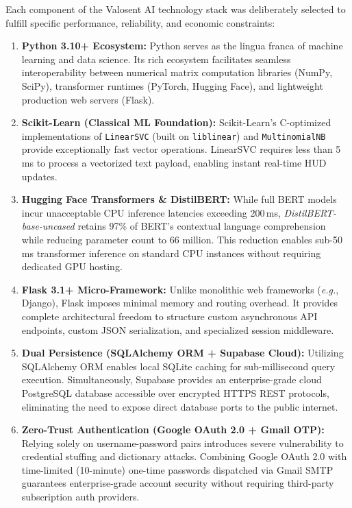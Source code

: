 Each component of the Valosent AI technology stack was deliberately selected to fulfill specific performance, reliability, and economic constraints:
\begin{enumerate}
    \item \textbf{Python 3.10+ Ecosystem:} Python serves as the lingua franca of machine learning and data science. Its rich ecosystem facilitates seamless interoperability between numerical matrix computation libraries (NumPy, SciPy), transformer runtimes (PyTorch, Hugging Face), and lightweight production web servers (Flask).
    \item \textbf{Scikit-Learn (Classical ML Foundation):} Scikit-Learn's C-optimized implementations of \texttt{LinearSVC} (built on \texttt{liblinear}) and \texttt{MultinomialNB} provide exceptionally fast vector operations. LinearSVC requires less than 5\,ms to process a vectorized text payload, enabling instant real-time HUD updates.
    \item \textbf{Hugging Face Transformers \& DistilBERT:} While full BERT models incur unacceptable CPU inference latencies exceeding 200\,ms, \textit{DistilBERT-base-uncased} retains 97\% of BERT's contextual language comprehension while reducing parameter count to 66 million. This reduction enables sub-50\,ms transformer inference on standard CPU instances without requiring dedicated GPU hosting.
    \item \textbf{Flask 3.1+ Micro-Framework:} Unlike monolithic web frameworks (\textit{e.g.}, Django), Flask imposes minimal memory and routing overhead. It provides complete architectural freedom to structure custom asynchronous API endpoints, custom JSON serialization, and specialized session middleware.
    \item \textbf{Dual Persistence (SQLAlchemy ORM + Supabase Cloud):} Utilizing SQLAlchemy ORM enables local SQLite caching for sub-millisecond query execution. Simultaneously, Supabase provides an enterprise-grade cloud PostgreSQL database accessible over encrypted HTTPS REST protocols, eliminating the need to expose direct database ports to the public internet.
    \item \textbf{Zero-Trust Authentication (Google OAuth 2.0 + Gmail OTP):} Relying solely on username-password pairs introduces severe vulnerability to credential stuffing and dictionary attacks. Combining Google OAuth 2.0 with time-limited (10-minute) one-time passwords dispatched via Gmail SMTP guarantees enterprise-grade account security without requiring third-party subscription auth providers.
\end{enumerate}

